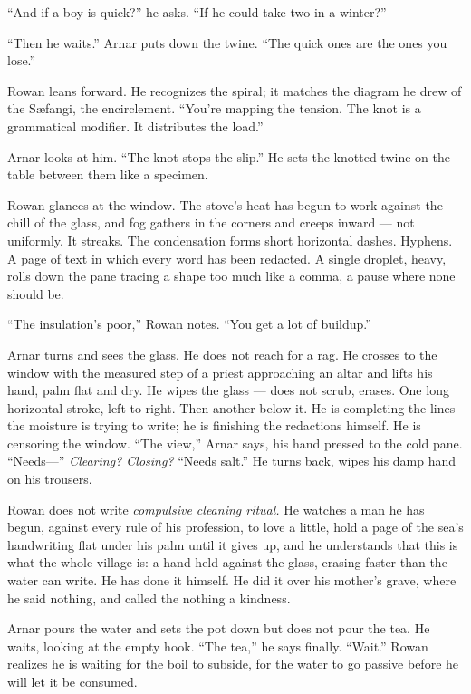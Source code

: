 \documentclass[11pt,oneside]{book}
\begin{document}
``And if a boy is quick?'' he asks. ``If he could take two in a winter?''

``Then he waits.'' Arnar puts down the twine. ``The quick ones are the
ones you lose.''

Rowan leans forward. He recognizes the spiral; it matches the diagram he
drew of the Sæfangi, the encirclement. ``You're mapping the tension. The
knot is a grammatical modifier. It distributes the load.''

Arnar looks at him. ``The knot stops the slip.'' He sets the knotted
twine on the table between them like a specimen.

Rowan glances at the window. The stove's heat has begun to work against
the chill of the glass, and fog gathers in the corners and creeps inward
--- not uniformly. It streaks. The condensation forms short horizontal
dashes. Hyphens. A page of text in which every word has been redacted. A
single droplet, heavy, rolls down the pane tracing a shape too much like
a comma, a pause where none should be.

``The insulation's poor,'' Rowan notes. ``You get a lot of buildup.''

Arnar turns and sees the glass. He does not reach for a rag. He crosses
to the window with the measured step of a priest approaching an altar
and lifts his hand, palm flat and dry. He wipes the glass --- does not
scrub, erases. One long horizontal stroke, left to right. Then another
below it. He is completing the lines the moisture is trying to write; he
is finishing the redactions himself. He is censoring the window. ``The
view,'' Arnar says, his hand pressed to the cold pane. ``Needs---''
\emph{Clearing? Closing?} ``Needs salt.'' He turns back, wipes his damp
hand on his trousers.

Rowan does not write \emph{compulsive cleaning ritual.} He watches a man
he has begun, against every rule of his profession, to love a little,
hold a page of the sea's handwriting flat under his palm until it gives
up, and he understands that this is what the whole village is: a hand
held against the glass, erasing faster than the water can write. He has
done it himself. He did it over his mother's grave, where he said
nothing, and called the nothing a kindness.

Arnar pours the water and sets the pot down but does not pour the tea.
He waits, looking at the empty hook. ``The tea,'' he says finally.
``Wait.'' Rowan realizes he is waiting for the boil to subside, for the
water to go passive before he will let it be consumed.
\end{document}
